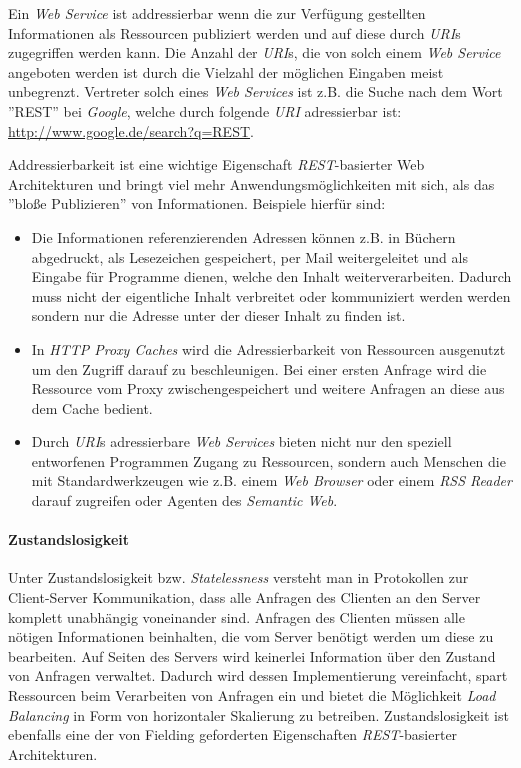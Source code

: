 Ein \textit{Web Service} ist addressierbar wenn die zur Verfügung
gestellten Informationen als Ressourcen publiziert werden und auf
diese durch \textit{URI}s zugegriffen werden kann. Die Anzahl der
\textit{URI}s, die von solch einem \textit{Web Service} angeboten
werden ist durch die Vielzahl der möglichen Eingaben meist unbegrenzt.
Vertreter solch eines \textit{Web Services} ist z.B. die Suche nach
dem Wort ''REST'' bei \textit{Google}, welche durch folgende
\textit{URI} adressierbar ist:
\url{http://www.google.de/search?q=REST}.

Addressierbarkeit ist eine wichtige Eigenschaft
\textit{REST}-basierter Web Architekturen und bringt viel mehr
Anwendungsmöglichkeiten mit sich, als das ''bloße Publizieren'' von
Informationen. Beispiele hierfür sind:

\begin{itemize}
\item Die Informationen referenzierenden Adressen können z.B. in
  Büchern abgedruckt, als Lesezeichen gespeichert, per Mail
  weitergeleitet und als Eingabe für Programme dienen, welche den
  Inhalt weiterverarbeiten. Dadurch muss nicht der eigentliche Inhalt
  verbreitet oder kommuniziert werden werden sondern nur die Adresse
  unter der dieser Inhalt zu finden ist.
\item In \textit{HTTP Proxy Caches} wird die Adressierbarkeit von
  Ressourcen ausgenutzt um den Zugriff darauf zu beschleunigen. Bei
  einer ersten Anfrage wird die Ressource vom Proxy
  zwischengespeichert und weitere Anfragen an diese aus dem Cache
  bedient.
\item Durch \textit{URI}s adressierbare \textit{Web Services} bieten
  nicht nur den speziell entworfenen Programmen Zugang zu Ressourcen,
  sondern auch Menschen die mit Standardwerkzeugen wie z.B. einem
  \textit{Web Browser} oder einem \textit{RSS Reader} darauf zugreifen
  oder Agenten des \textit{Semantic Web}.
\end{itemize}

\paragraph{Zustandslosigkeit}

Unter Zustandslosigkeit bzw. \textit{Statelessness} versteht man in
Protokollen zur Client-Server Kommunikation, dass alle Anfragen des
Clienten an den Server komplett unabhängig voneinander sind. Anfragen
des Clienten müssen alle nötigen Informationen beinhalten, die vom
Server benötigt werden um diese zu bearbeiten. Auf Seiten des Servers
wird keinerlei Information über den Zustand von Anfragen
verwaltet. Dadurch wird dessen Implementierung vereinfacht, spart
Ressourcen beim Verarbeiten von Anfragen ein und bietet die
Möglichkeit \textit{Load Balancing} in Form von horizontaler
Skalierung zu betreiben. Zustandslosigkeit ist ebenfalls eine der von
Fielding geforderten Eigenschaften \textit{REST}-basierter
Architekturen.

